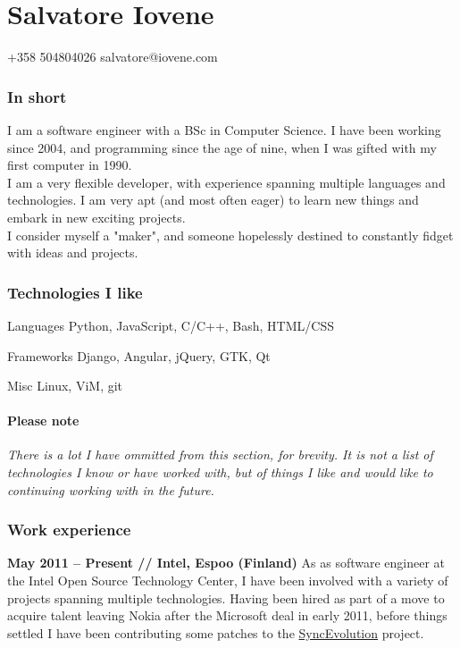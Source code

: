\documentclass[10pt]{tccv}
\begin{document}
	\part{Salvatore Iovene}
			{+358 504804026}
			{salvatore@iovene.com}


		\section{In short}
			I am a software engineer with a BSc in Computer Science. I have
			been working since 2004, and programming since the age of nine,
			when I was gifted with my first computer in 1990.\\
			
			I am a very flexible developer, with experience spanning multiple
			languages and technologies. I am very apt (and most often eager) to
			learn new things and embark in new exciting projects.\\
			
			I consider myself a "maker", and someone hopelessly destined to
			constantly fidget with ideas and projects.


		\section{Technologies I like}
			\begin{factlist}
				\item{Languages}
					{Python, JavaScript, C/C++, Bash,
					HTML/CSS}

				\item{Frameworks}
					{Django, Angular, jQuery, GTK, Qt}

				\item{Misc}
					{Linux, ViM, git }
			\end{factlist}

			\subsection{Please note}
				\emph{There is a lot I have ommitted from this section, for
				brevity. It is not a list of technologies I know or have worked
				with, but of things I like and would like to continuing working
				with in the future.}


		\section{Work experience}
				\textbf{May 2011 -- Present // Intel, Espoo (Finland)}
				As as software engineer at the Intel Open Source Technology
				Center, I have been involved with a variety of projects
				spanning multiple technologies. Having been hired as part of a
				move to acquire talent leaving Nokia after the Microsoft deal
				in early 2011, before things settled I have been contributing
				some patches to the
				\href{https://syncevolution.org/}{SyncEvolution} project.\\
\end{document}

